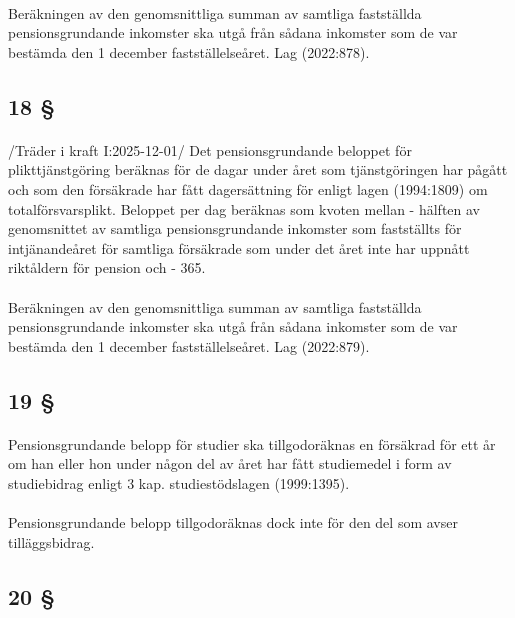\documentclass[a4paper,notitlepage,openany,10pt]{book}
\begin{document}
\paragraph*{}
Beräkningen av den genomsnittliga summan av samtliga fastställda pensionsgrundande inkomster ska utgå från sådana inkomster som de var bestämda den 1 december fastställelseåret.
Lag (2022:878).
\subsection*{18 §}
\paragraph*{}
/Träder i kraft I:2025-12-01/
Det pensionsgrundande beloppet för plikttjänstgöring beräknas för de dagar under året som tjänstgöringen har pågått och som den försäkrade har fått dagersättning för enligt lagen (1994:1809) om totalförsvarsplikt. Beloppet per dag beräknas som kvoten mellan
\newline - hälften av genomsnittet av samtliga pensionsgrundande inkomster som fastställts för intjänandeåret för samtliga försäkrade som under det året inte har uppnått riktåldern för pension och
\newline - 365.
\paragraph*{}
Beräkningen av den genomsnittliga summan av samtliga fastställda pensionsgrundande inkomster ska utgå från sådana inkomster som de var bestämda den 1 december fastställelseåret.
Lag (2022:879).
\subsection*{19 §}
\paragraph*{}
Pensionsgrundande belopp för studier ska tillgodoräknas en försäkrad för ett år om han eller hon under någon del av året har fått studiemedel i form av studiebidrag enligt 3 kap. studiestödslagen (1999:1395).
\paragraph*{}
Pensionsgrundande belopp tillgodoräknas dock inte för den del som avser tilläggsbidrag.
\subsection*{20 §}
\end{document}
